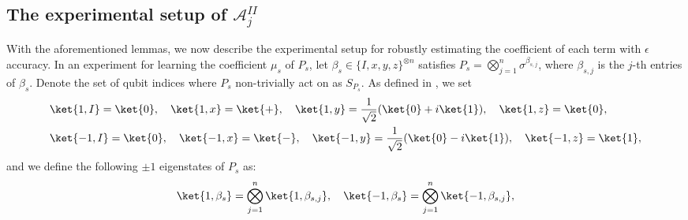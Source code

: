 \documentclass[twocolumn,superscriptaddress,aps,showpacs,amsmath,amstex,amssymb,citeautoscript,floatfix,pra,preprintnumbers]{revtex4-2}
\theoremstyle{plain}
\theoremstyle{plain}
\theoremstyle{plain}
\theoremstyle{plain}
\theoremstyle{plain}
\theoremstyle{plain}
\begin{document}
\begin{appendix}
\subsection{The experimental setup of \texorpdfstring{$\mathcal{A}^{II}_j$}{A II j}}
\label{sec:experimental_setup_of_A_2}
With the aforementioned lemmas, we now describe the experimental setup for robustly estimating the coefficient of each term with $\epsilon$ accuracy. In an experiment for learning the coefficient $\mu_s$ of $P_s$, let $\beta_s\in\{I,x,y,z\}^{\otimes n}$ satisfies $P_s = \bigotimes_{j=1}^n \sigma^{\beta_{s,j}}$, where $\beta_{s,j}$ is the $j$-th entries of $\beta_s$. Denote the set of qubit indices where $P_s$ non-trivially act on as $S_{P_s}$. As defined in , we set
\begin{equation}
    \begin{split}
        &\ket{1,I} = \ket{0},  \quad \ket{1,x} = \ket{+}, \quad \ket{1,y} = \frac{1}{\sqrt{2}}(\ket{0}+i\ket{1}), \quad \ket{1,z} = \ket{0},\\
        &\ket{-1,I} = \ket{0}, \quad \ket{-1,x} = \ket{-},\quad \ket{-1,y} = \frac{1}{\sqrt{2}}(\ket{0}-i\ket{1}), \quad \ket{-1,z} = \ket{1},
    \end{split}
\end{equation}
and we define the following $\pm 1$ eigenstates of $P_s$ as:
\begin{equation}
    \ket{1,\beta_s} = \bigotimes_{j=1}^n \ket{1,\beta_{s,j}},\quad \ket{-1,\beta_s} = \bigotimes_{j=1}^n \ket{-1,\beta_{s,j}},
\end{equation}


\end{appendix}
\end{document}

